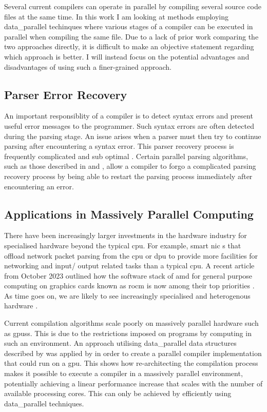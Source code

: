 Several current compilers can operate in parallel by compiling several source
code files at the same time. In this work I am looking at methods employing
\gls{data_parallel} techinques where various stages of a compiler can be executed in
parallel when compiling the same file. Due to a lack of prior work comparing
the two approaches directly, it is difficult to make an objective statement
regarding which approach is better. I will instead focus on the potential
advantages and disadvantages of using such a finer-grained approach.

\subsection{Parser Error Recovery}

An important responsiblity of a compiler is to detect syntax errors and
present useful error messages to the programmer. Such syntax errors are often
detected during the parsing stage. An issue arises when a parser must then try
to continue parsing after encountering a syntax error. This parser recovery
process is frequently complicated and sub optimal \citep{medeiros_syntax_2018,
hutchison_pika_2020}. Certain parallel parsing algorithms, such as those
described in \citet{clarke_error_1993} and \cite{barenghi_parallel_2015}, allow
a compiler to forgo a complicated parsing recovery process by being able to
restart the parsing process immediately after encountering an error.

\subsection{Applications in Massively Parallel Computing}

There have been increasingly larger investments in the hardware industry for
specialised hardware beyond the typical \gls{cpu}.  For example, smart \gls{nic}
s that offload network packet parsing from the \gls{cpu} or \gls{dpu} to provide
more facilities for networking and input/ output related tasks than a typical
\gls{cpu}. A recent article from October 2023 outlined how the software stack
of \gls{amd} for general purpose computing on graphics cards known as \gls{rocm}
is now among their top priorities \citep{ward-foxton_rocm_2023}. As time goes
on, we are likely to see increasingly specialised and heterogenous hardware
\citep{stefan_lets_2021}.

Current compilation algorithms scale poorly on massively parallel hardware
such as \glspl{gpu}s. This is due to the restrictions imposed on programs by
computing in such an environment. An approach utilising \gls{data_parallel}
data structures described by \cite{hillis_data_1986} was applied by
\cite{voetter_compilation_2022} in order to create a parallel compiler
implementation that could run on a \gls{gpu}. This shows how  re-architecting
the compilation process makes it possible to execute a compiler in a massively
parallel environment, potentially achieving a linear performance increase that
scales with the number of available processing cores. This can only be achieved
by efficiently using \gls{data_parallel} techniques.

